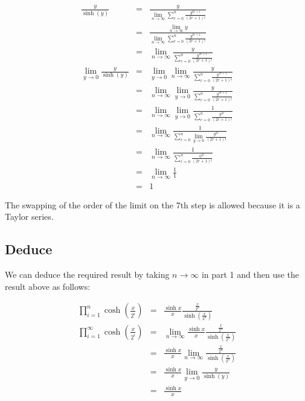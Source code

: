 \documentclass{article}
\begin{document}
\begin{eqnarray*}
                        \frac{y}{\sinh(y)} &=& \frac{y}{\lim\limits_{n \to \infty} \sum\limits_{r = 0}^n \frac{y^{2r+1}}{(2r+1)!}} \\
                                           &=& \frac{\lim\limits_{n \to \infty} y}{\lim\limits_{n \to \infty} \sum\limits_{r = 0}^n \frac{y^{2r+1}}{(2r+1)!}} \\
                                           &=& \lim\limits_{n \to \infty} \frac{y}{\sum\limits_{r = 0}^n \frac{y^{2r+1}}{(2r+1)!}} \\
  \lim\limits_{y \to 0} \frac{y}{\sinh(y)} &=& \lim\limits_{y \to 0} \lim\limits_{n \to \infty} \frac{y}{\sum\limits_{r = 0}^n \frac{y^{2r+1}}{(2r+1)!}} \\
                                           &=& \lim\limits_{n \to \infty} \lim\limits_{y \to 0} \frac{y}{\sum\limits_{r = 0}^n \frac{y^{2r+1}}{(2r+1)!}} \\
                                           &=& \lim\limits_{n \to \infty} \lim\limits_{y \to 0} \frac{1}{\sum\limits_{r = 0}^n \frac{y^{2r}}{(2r+1)!}} \\
                                           &=& \lim\limits_{n \to \infty} \frac{1}{\sum\limits_{r = 0}^n \lim\limits_{y \to 0} \frac{y^{2r}}{(2r+1)!}} \\
                                           &=& \lim\limits_{n \to \infty} \frac{1}{\sum\limits_{r = 0}^n \frac{0^{2r}}{(2r+1)!}} \\
                                           &=& \lim\limits_{n \to \infty} \frac{1}{1} \\
                                           &=& 1
\end{eqnarray*}

The swapping of the order of the limit on the 7th step is allowed because it is a Taylor series.

\subsection*{Deduce}
We can deduce the required result by taking $ n \to \infty $ in part 1 and then use the result above as follows:

\begin{eqnarray*}
       \prod\limits_{i = 1}^{n} \cosh(\frac{x}{2^i}) &=& \frac{\sinh{x}}{x}\frac{\frac{x}{2^n}}{\sinh\left(\frac{x}{2^n}\right)} \\
  \prod\limits_{i = 1}^{\infty} \cosh(\frac{x}{2^i}) &=& \lim\limits_{n \to \infty} \frac{\sinh{x}}{x}\frac{\frac{x}{2^n}}{\sinh\left(\frac{x}{2^n}\right)} \\
                                                     &=& \frac{\sinh{x}}{x} \lim\limits_{n \to \infty} \frac{\frac{x}{2^n}}{\sinh\left(\frac{x}{2^n}\right)} \\
                                                     &=& \frac{\sinh{x}}{x} \lim\limits_{y \to 0} \frac{y}{\sinh(y)} \\
                                                     &=& \frac{\sinh{x}}{x} 
\end{eqnarray*}
\end{document}
